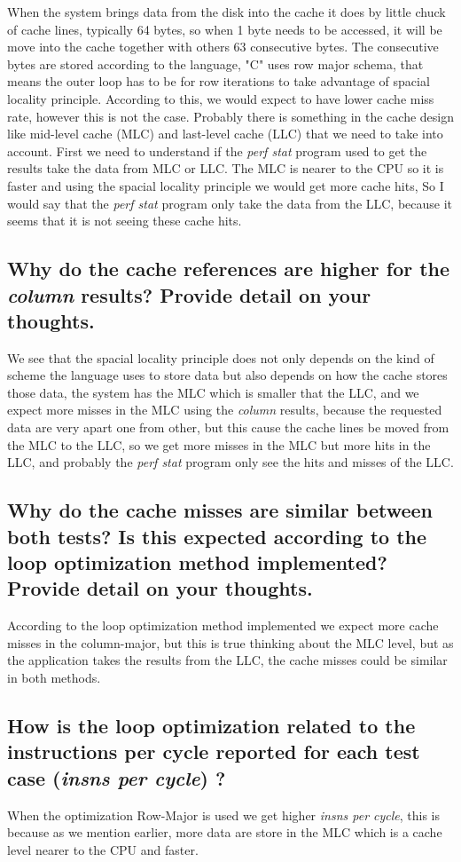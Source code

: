 \documentclass[12pt]{article}%
\begin{document}
When the system brings data from the disk into the cache it does by little chuck of cache lines, typically 64 bytes, so when 1 byte needs to be accessed, it will be move into the cache together with others 63 consecutive bytes. The consecutive bytes are stored according to the language, "C" uses row major schema, that means the outer loop has to be for row iterations to take advantage of spacial locality principle. 
According to this, we would expect to have lower cache miss rate, however this is not the case. Probably there is something in the cache design like mid-level cache (MLC) and last-level cache (LLC) that we need to take into account. First we need to understand if the \textit{perf stat} program used to get the results take the data from  MLC or LLC. The MLC is nearer to the CPU so it is faster and using the spacial locality principle we would get more cache hits,  So I would say that the \textit{perf stat} program only take the data from the LLC, because it seems that it is not seeing these cache hits. 

\subsection {Why do the cache references are higher for the \textit{column} results? Provide detail on your thoughts.}

We see that the spacial locality principle does not only depends on  the kind of scheme the language uses to store data but also depends on how the cache stores those data, the system has the MLC which is smaller that the LLC, and we expect more misses in the MLC using the \textit{column} results, because the requested data are very apart one from other, but this cause the cache lines be moved from the MLC to the LLC, so we get more misses in the MLC but more hits in the LLC, and probably the \textit{perf stat} program only see the hits and misses of the LLC. 

\subsection {Why do the cache misses are similar between both tests? Is this expected according to the loop optimization method implemented? Provide detail on your thoughts.}

According to the loop optimization method implemented we expect more cache misses in the column-major, but this is true thinking about the MLC level, but as the application takes the results from the LLC, the cache misses could be similar in both methods. 

\subsection {How is the loop optimization related to the instructions per cycle reported for each test case (\textit{insns per cycle}) ?}

When the optimization Row-Major is used we get higher \textit{insns per cycle}, this is because as we mention earlier, more data are store in the MLC which is a cache level nearer to the CPU and faster.   
\end{document}
